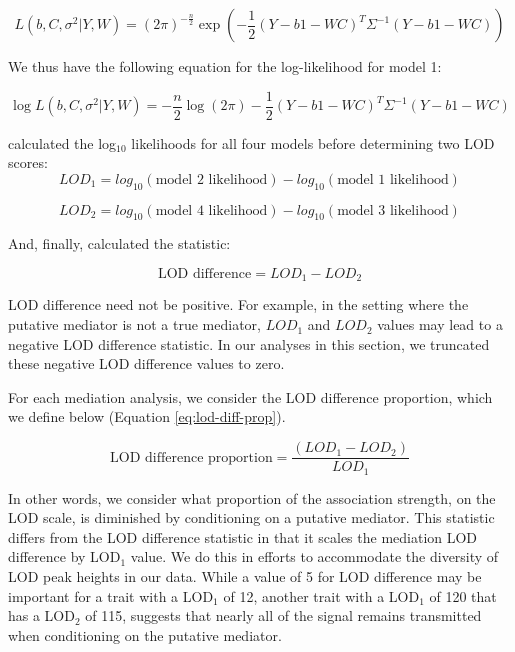 \documentclass{article}
\begin{document}
\begin{boehm}
\begin{equation}
    L(b, C, \sigma^2| Y, W) = (2\pi)^{- \frac{n}{2}}\exp{ \left(- \frac{1}{2}(Y - b1 - WC)^T\Sigma^{-1}(Y - b1 - WC)\right)}
\end{equation}

We thus have the following equation for the log-likelihood for model 1:

\begin{equation}
    \log L(b, C, \sigma^2 | Y, W) = - \frac{n}{2}\log (2\pi) - \frac{1}{2} (Y - b1 - WC)^T\Sigma^{-1}(Y - b1 - WC)
\end{equation}


\citet{chick2016defining} calculated the log$_{10}$ likelihoods for all four models before determining two LOD scores:
\begin{equation}
LOD_1 = log_{10}(\text{model 2 likelihood}) - log_{10}(\text{model 1 likelihood})
\end{equation}

\begin{equation}
LOD_2 = log_{10}(\text{model 4 likelihood}) - log_{10}(\text{model 3 likelihood})
\end{equation}

And, finally, \citet{keller2018genetic} calculated the statistic:

\begin{equation}
\text{LOD difference} = LOD_1 - LOD_2
\end{equation}

LOD difference need not be positive. For example, in the setting where the putative mediator is not a true mediator, $LOD_1$ and $LOD_2$ values may lead to a negative LOD difference statistic. In our analyses in this section, we truncated these negative LOD difference values to zero.

For each mediation analysis, we consider the LOD difference proportion, which we define below (Equation \ref{eq:lod-diff-prop}).

\begin{equation}
\text{LOD difference proportion} = \frac{(LOD_1 - LOD_2)}{LOD_1}
\label{eq:lod-diff-prop}
\end{equation}

In other words, we consider what proportion of the association strength, on the LOD scale, is diminished by conditioning on a putative mediator. This statistic differs from the LOD difference statistic in that it scales the mediation LOD difference by LOD$_1$ value. We do this in efforts to accommodate the diversity of LOD peak heights in our data. While a value of 5 for LOD difference may be important for a trait with a LOD$_1$ of 12, another trait with a LOD$_1$ of 120 that has a LOD$_2$ of 115, suggests that nearly all of the signal remains transmitted when conditioning on the putative mediator.


\end{boehm}
\end{document}

